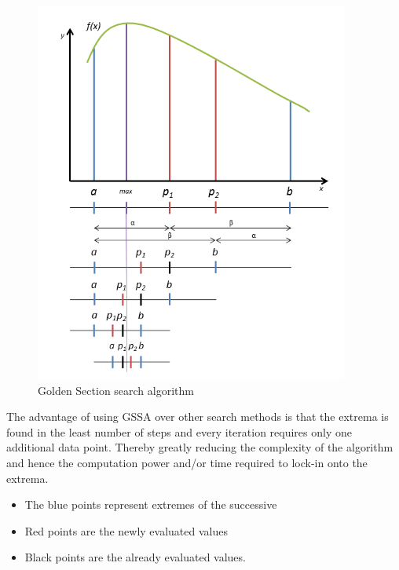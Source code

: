 { 
\begin{figure}[H]
  \begin{center}
  \includegraphics[width=0.92\textwidth]{images/Golden_search_curve}
  \caption{ Golden Section search algorithm }
  \label{fig:Golden_search_curve}
  \end{center}
  \end{figure}
  
The advantage of using \ac{GSSA} over other search methods is that the extrema is found in the least number of steps and every iteration requires only one additional data point. Thereby greatly reducing the complexity of the algorithm and hence the computation power and/or time required to lock-in onto the extrema.

\begin{itemize}
	 \item The blue points represent extremes of the successive
	 \item Red points  are the newly evaluated values
	 \item Black points are the already evaluated values.
 \end{itemize}


}
